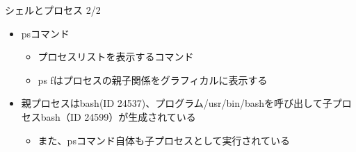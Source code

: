 \documentclass[12pt,aspectratio=169]{beamer}
\begin{document}
\begin{frame}{シェルとプロセス 2/2}
  \begin{itemize}
    \item psコマンド
      \begin{itemize}
        \item プロセスリストを表示するコマンド
        \item ps fはプロセスの親子関係をグラフィカルに表示する
      \end{itemize}
  \end{itemize}


  \begin{itemize}
    \item 親プロセスはbash(ID 24537)、プログラム/usr/bin/bashを呼び出して子プロセスbash（ID 24599）が生成されている
      \begin{itemize}
        \item また、psコマンド自体も子プロセスとして実行されている
      \end{itemize}
  \end{itemize}

\end{frame}
\end{document}
